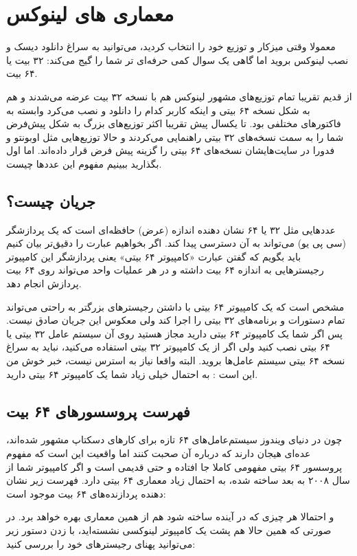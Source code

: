 \section{معماری های لینوکس}
معمولا وقتی میزکار و توزیع خود را انتخاب کردید، می‌توانید به سراغ دانلود دیسک و نصب لینوکس بروید اما گاهی یک سوال کمی حرفه‌ای تر شما را گیج می‌کند: ۳۲ بیت یا ۶۴ بیت.

از قدیم تقریبا تمام توزیع‌های مشهور لینوکس هم با نسخه ۳۲ بیت عرضه می‌شدند و هم به شکل نسخه ۶۴ بیتی و اینکه کاربر کدام را دانلود و نصب می‌کرد وابسته به فاکتورهای مختلفی بود. تا یکسال پیش تقریبا اکثر توزیع‌های بزرگ به شکل پیش‌فرض شما را به سمت نسخه‌های ۳۲ بیتی راهنمایی می‌کردند و حالا توزیع‌هایی مثل اوبونتو و فدورا در سایت‌هایشان نسخه‌های ۶۴ بیتی را گزینه پیش فرض قرار داده‌اند. اما اول بگذارید ببینیم مفهوم این عددها چیست.

\subsection*{جریان چیست؟}

عددهایی مثل ۳۲ یا ۶۴ نشان دهنده اندازه (عرض) حافظه‌ای است که یک پردازشگر (سی پی یو) می‌تواند به آن دسترسی پیدا کند. اگر بخواهیم عبارت را دقیق‌تر بیان کنیم باید بگویم که گفتن عبارت «کامپیوتر ۶۴ بیتی» یعنی پردازشگر این کامپیوتر رجیسترهایی به اندازه ۶۴ بیت داشته و در هر عملیات واحد می‌تواند روی ۶۴ بیت پردازش انجام دهد.

مشخص است که یک کامپیوتر ۶۴ بیتی با داشتن رجیسترهای بزرگتر به راحتی می‌تواند تمام دستورات و برنامه‌های ۳۲ بیتی را اجرا کند ولی معکوس این جریان صادق نیست. پس اگر شما یک کامپیوتر ۶۴ بیتی دارید مجاز هستید روی آن سیستم عامل ۳۲ بیتی یا ۶۴ بیتی نصب کنید ولی اگر از یک کامپیوتر ۳۲ بیتی استفاده می‌کنید، نباید به سراغ نسخه ۶۴ بیتی سیستم عامل‌ها بروید. البته واقعا نیاز به استرس نیست، خبر خوش من این است : به احتمال خیلی زیاد شما یک کامپیوتر ۶۴ بیتی دارید.

\subsection*{فهرست پروسسور‌های ۶۴ بیت}
چون در دنیای ویندوز سیستم‌عامل‌های ۶۴ تازه برای کارهای دسکتاپ مشهور شده‌اند، عده‌ای هیجان دارند که درباره آن صحبت کنند اما واقعیت این است که مفهوم پروسسور ۶۴ بیتی مفهومی کاملا جا افتاده و حتی قدیمی است و اگر کامپیوتر شما از سال ۲۰۰۸ به بعد ساخته شده، به احتمال زیاد معماری ۶۴ بیتی دارد. فهرست زیر نشان دهنده پردازنده‌های ۶۴ بیت موجود است:
\begin{mybox}
\flushleft
	\item {}
	
	
	\item {}
	
\end{mybox}
و احتمالا هر چیزی که در آینده ساخته شود هم از همین معماری بهره خواهد برد. در صورتی که همین حالا هم پشت یک کامپیوتر لینوکسی نشسته‌اید، با زدن دستور زیر می‌توانید پهنای رجیسترهای خود را بررسی کنید:

